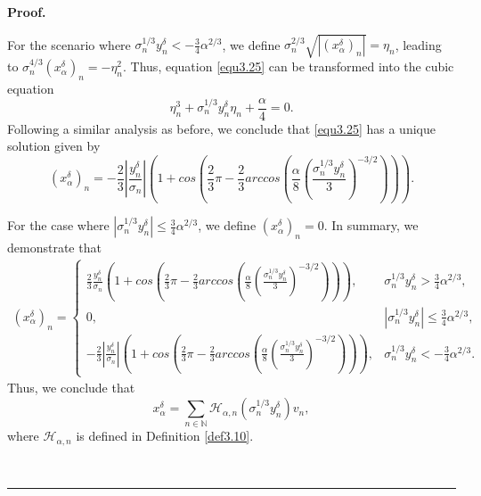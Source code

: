 \documentclass[a4paper,12pt]{article}
\numberwithin{equation}{section}
\newenvironment{proof}[1][Proof]{\textbf{#1.} }
{\ \rule{0.75em}{0.75em}\smallskip}
\begin{document}
\begin{proof}
    \par For the scenario where $\sigma_{n}^{1/3}y^{\delta}_{n}< -\frac{3}{4}\alpha^{2/3}$, we define $\sigma_{n}^{2/3}\sqrt{|\left(x_{\alpha}^{\delta}\right)_{n}|}=\eta_{n}$, leading to $\sigma_{n}^{4/3}\left(x_{\alpha}^{\delta}\right)_{n}=-\eta_{n}^{2}$. Thus, equation \eqref{equ3.25} can be transformed into the cubic equation
    \begin{equation}\label{equ3.27}
        \eta_{n}^{3}+\sigma_{n}^{1/3}y^{\delta}_{n}\eta_{n}+\frac{\alpha}{4}=0.
    \end{equation}
    Following a similar analysis as before, we conclude that \eqref{equ3.25} has a unique solution given by
    \begin{equation*}
        \left(x_{\alpha}^{\delta}\right)_{n}=-\frac{2}{3}\left|\frac{y^{\delta}_{n}}{\sigma_{n}}\right|\left(1+cos\left(\frac{2}{3}\pi-\frac{2}{3}arccos\left(\frac{\alpha}{8}\left(\frac{\sigma_{n}^{1/3}y^{\delta}_{n}}{3}\right)^{-3/2}\right)\right)\right).
    \end{equation*}
    
    \par For the case where $\left|\sigma_{n}^{1/3}y^{\delta}_{n}\right|\leq \frac{3}{4}\alpha^{2/3}$, we define $\left(x_{\alpha}^{\delta}\right)_{n}=0$. In summary, we demonstrate that
    \begin{align*}
        \left(x_{\alpha}^{\delta}\right)_{n}=
        \left\{             
             \begin{array}{ll}
             \frac{2}{3}\frac{y^{\delta}_{n}}{\sigma_{n}}\left(1+cos\left(\frac{2}{3}\pi-\frac{2}{3}arccos\left(\frac{\alpha}{8}\left(\frac{\sigma_{n}^{1/3}y^{\delta}_{n}}{3}\right)^{-3/2}\right)\right)\right), & \sigma_{n}^{1/3}y^{\delta}_{n}> \frac{3}{4}\alpha^{2/3}, \\[10pt]
             0, & \left|\sigma_{n}^{1/3}y^{\delta}_{n}\right|\leq \frac{3}{4}\alpha^{2/3} , \\[6pt]
             -\frac{2}{3}\left|\frac{y^{\delta}_{n}}{\sigma_{n}}\right|\left(1+cos\left(\frac{2}{3}\pi-\frac{2}{3}arccos\left(\frac{\alpha}{8}\left(\frac{\sigma_{n}^{1/3}y^{\delta}_{n}}{3}\right)^{-3/2}\right)\right)\right), & \sigma_{n}^{1/3}y^{\delta}_{n}< -\frac{3}{4}\alpha^{2/3}.
             \end{array}
        \right.
    \end{align*}
    Thus, we conclude that
    \begin{equation*}
         x_{\alpha}^{\delta}=\sum_{n\in\mathbb{N}}\mathcal{H}_{\alpha,n} \left(\sigma_{n}^{1/3}y^{\delta}_{n}\right)v_{n},
    \end{equation*}
    where $\mathcal{H}_{\alpha,n}$ is defined in Definition \ref{def3.10}.
    

\end{proof}
\end{document}
